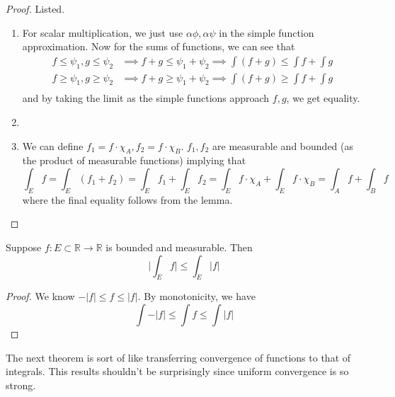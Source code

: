   \begin{proof} 
    Listed. 
    \begin{enumerate}
      \item For scalar multiplication, we just use $\alpha \phi, \alpha \psi$ in the simple function approximation. Now for the sums of functions, we can see that 
        \begin{align}
          f \leq \psi_1, g \leq \psi_2 & \implies f + g \leq \psi_1 + \psi_2 \implies \int (f + g) \leq \int f + \int g \\ 
          f \geq \psi_1, g \geq \psi_2 & \implies f + g \geq \psi_1 + \psi_2 \implies \int (f + g) \geq \int f + \int g \\ 
        \end{align} 
        and by taking the limit as the simple functions approach $f, g$, we get equality. 
      \item 
      \item We can define $f_1 = f \cdot \chi_A, f_2 = f \cdot \chi_B$. $f_1, f_2$ are measurable and bounded (as the product of measurable functions) implying that 
        \begin{equation}
          \int_E f = \int_E (f_1 + f_2) = \int_E f_1 + \int_E f_2 = \int_E f \cdot \chi_A + \int_E f \cdot \chi_B = \int_A f + \int_B f
        \end{equation}
        where the final equality follows from the lemma. 
    \end{enumerate}
  \end{proof} 

  \begin{corollary}[]
    Suppose $f: E \subset \mathbb{R} \to \mathbb{R}$ is bounded and measurable. Then 
    \begin{equation}
      \bigg| \int_E f \bigg| \leq \int_E |f| 
    \end{equation}
  \end{corollary} 
  \begin{proof}
    We know $-|f| \leq f \leq |f|$. By monotonicity, we have 
    \begin{equation}
      \int -|f| \leq \int f \leq \int |f|
    \end{equation}
  \end{proof} 

  The next theorem is sort of like transferring convergence of functions to that of integrals. This results shouldn't be surprisingly since uniform convergence is so strong.  

